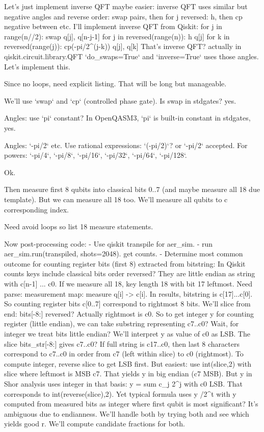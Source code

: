 \begin{decodedreasoningpanel}
Let's just implement inverse QFT maybe easier: inverse QFT uses similar but negative angles and reverse order:
swap pairs, then for j reversed: h, then cp negative between etc. I'll implement inverse QFT from Qiskit:
for j in range(n//2): swap q[j], q[n-j-1]
for j in reversed(range(n)):
 h q[j]
 for k in reversed(range(j)):
  cp(-pi/2\textasciicircum{}(j-k)) q[j], q[k]
That's inverse QFT? actually in qiskit.circuit.library.QFT `do\_swaps=True` and `inverse=True` uses those angles. Let's implement this.

Since no loops, need explicit listing. That will be long but manageable.

We'll use `swap` and `cp` (controlled phase gate). Is swap in stdgates? yes.

Angles: use `pi` constant? In OpenQASM3, `pi` is built-in constant in stdgates, yes.

Angles: `-pi/2` etc. Use rational expressions: `(-pi/2)`? or `-pi/2` accepted. For powers: `-pi/4`, `-pi/8`, `-pi/16`, `-pi/32`, `-pi/64`, `-pi/128`.

Ok.

Then measure first 8 qubits into classical bits 0..7 (and maybe measure all 18 due template). But we can measure all 18 too. We'll measure all qubits to c corresponding index.

Need avoid loops so list 18 measure statements.

Now post-processing code:
- Use qiskit transpile for aer\_sim.
- run aer\_sim.run(transpiled, shots=2048). get counts.
- Determine most common outcome for counting register bits (first 8) extracted from bitstring: In Qiskit counts keys include classical bits order reversed? They are little endian as string with c[n-1] ... c0. If we measure all 18, key length 18 with bit 17 leftmost.
Need parse: measurement map: measure q[i] -> c[i]. In results, bitstring is c[17]...c[0]. So counting register bits c[0..7] correspond to rightmost 8 bits. We'll slice from end: bits[-8:] reversed? Actually rightmost is c0. So to get integer y for counting register (little endian), we can take substring representing c7..c0? Wait, for integer we treat bits little endian? We'll interpret y as value of c0 as LSB. The slice bits\_str[-8:] gives c7..c0? If full string is c17..c0, then last 8 characters correspond to c7..c0 in order from c7 (left within slice) to c0 (rightmost). To compute integer, reverse slice to get LSB first. But easiest: use int(slice,2) with slice where leftmost is MSB c7. That yields y in big endian (c7 MSB). But y in Shor analysis uses integer in that basis: y = sum c\_j 2\textasciicircum{}j with c0 LSB. That corresponds to int(reverse(slice),2). Yet typical formula uses y /2\textasciicircum{}t with y computed from measured bits as integer where first qubit is most significant? It's ambiguous due to endianness. We'll handle both by trying both and see which yields good r. We'll compute candidate fractions for both.


\end{decodedreasoningpanel}
